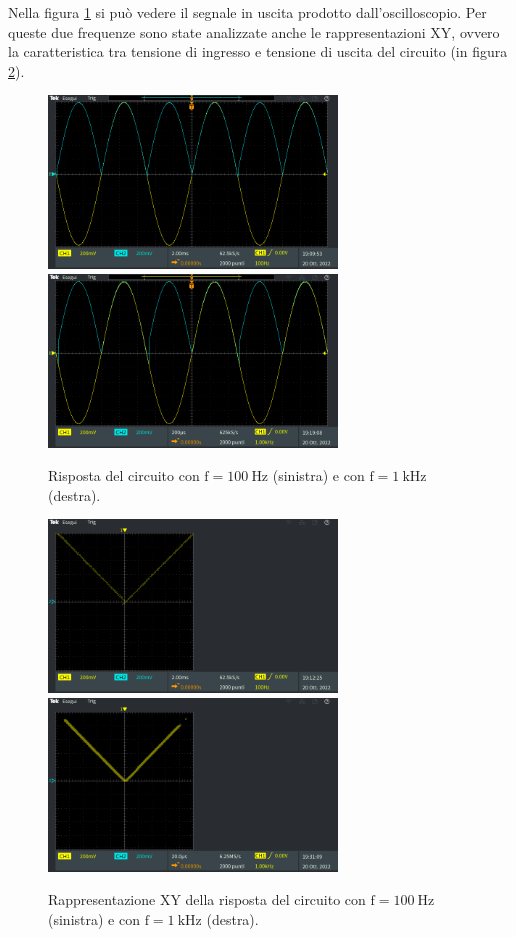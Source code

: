 \documentclass{report}
\begin{document}
Nella figura \ref{figura:uscita11} si può vedere il segnale in uscita prodotto dall'oscilloscopio. Per queste due frequenze sono state analizzate anche le rappresentazioni XY, ovvero la caratteristica tra tensione di ingresso e tensione di uscita del circuito (in figura \ref{figura:xyuscita1}).
\begin{figure}[h!]
	\centering
	\includegraphics[height=4.6cm]{immagini/TEK00000}
	\includegraphics[height=4.6cm]{immagini/TEK00003}
	\caption{Risposta del circuito con $\mathrm{f= \SI{100}{\hertz}}$ (sinistra) e con $\mathrm{f= \SI{1}{k\hertz}}$ (destra).}
	\label{figura:uscita11}
\end{figure}
\begin{figure}[h!]
	\centering
	\includegraphics[height=4.6cm]{immagini/TEK00001}
	\includegraphics[height=4.6cm]{immagini/TEK00010}
	\caption{Rappresentazione XY della risposta del circuito con $\mathrm{f= \SI{100}{\hertz}}$ (sinistra) e con $\mathrm{f= \SI{1}{k\hertz}}$ (destra).}
	\label{figura:xyuscita1}
\end{figure}
\end{document}
